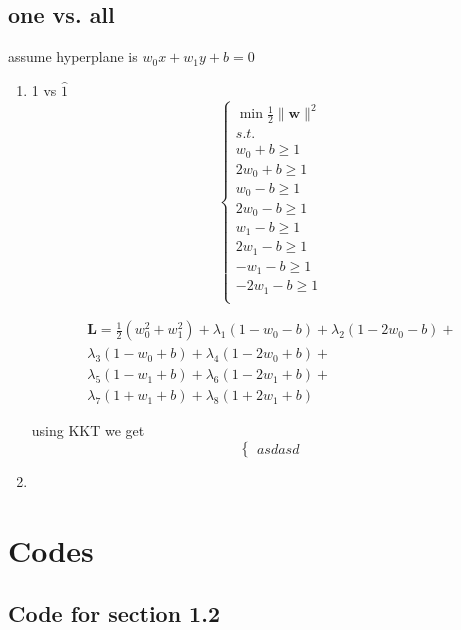 \documentclass[11pt]{article}
\newcommand{\mfile}[1]  {{\small }} %
\newcommand{\mtx}[1]{\mathbf{#1}}
\newcommand{\vct}[1]{\mathbf{#1}}
\def \mL {\mtx{L}}
\def \vw {\vct{w}}
\begin{document}
\subsection{one vs. all}

assume hyperplane is $w_0x+w_1y+b=0$

\begin{enumerate}
	\item 1 vs $\hat{1}$
	\begin{equation}
		\left\{
		\begin{aligned}
			\min\frac{1}{2} \|\vw\|^2\\
			s.t.\\
			w_0+b\geq 1\\
			2w_0+b\geq 1\\
			w_0-b\geq 1\\
			2w_0-b\geq 1\\
			w_1-b\geq 1\\
			2w_1-b\geq 1\\
			-w_1-b\geq 1\\
			-2w_1-b\geq 1\\
		\end{aligned}
		\right.
	\end{equation}

	\begin{align*}
		\mL = \frac{1}{2}(w_0^2+w_1^2) + 
		\lambda_1(1-w_0-b)+ \lambda_2(1-2w_0-b)+\\
		\lambda_3(1-w_0+b)+\lambda_4(1-2w_0+b)+\\
		\lambda_5(1-w_1+b)+\lambda_6(1-2w_1+b)+\\
		\lambda_7(1+w_1+b)+\lambda_8(1+2w_1+b)
	\end{align*}

	using KKT we get
	\begin{equation}
		\left\{
		\begin{aligned}
			asdasd
		\end{aligned}
		\right.
	\end{equation}
	
	\item 
\end{enumerate}

\section{Codes}

\subsection{Code for section 1.2}\label{code:q12}
\mfile{Q1_2.m}
\end{document}
